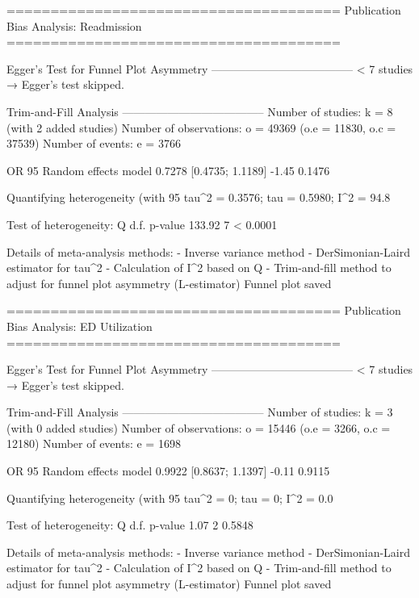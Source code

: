 ======================================
Publication Bias Analysis: Readmission 
======================================
                                                                                                                                                        
Egger's Test for Funnel Plot Asymmetry
--------------------------------------
  < 7 studies → Egger’s test skipped.

Trim-and-Fill Analysis
--------------------------------------
Number of studies: k = 8 (with 2 added studies)
Number of observations: o = 49369 (o.e = 11830, o.c = 37539)
Number of events: e = 3766

                         OR           95%
Random effects model 0.7278 [0.4735; 1.1189] -1.45  0.1476

Quantifying heterogeneity (with 95%
 tau^2 = 0.3576; tau = 0.5980; I^2 = 94.8%

Test of heterogeneity:
      Q d.f.  p-value
 133.92    7 < 0.0001

Details of meta-analysis methods:
- Inverse variance method
- DerSimonian-Laird estimator for tau^2
- Calculation of I^2 based on Q
- Trim-and-fill method to adjust for funnel plot asymmetry (L-estimator)
  Funnel plot saved

======================================
Publication Bias Analysis: ED Utilization 
======================================
                                                                                                                                                        
Egger's Test for Funnel Plot Asymmetry
--------------------------------------
  < 7 studies → Egger’s test skipped.

Trim-and-Fill Analysis
--------------------------------------
Number of studies: k = 3 (with 0 added studies)
Number of observations: o = 15446 (o.e = 3266, o.c = 12180)
Number of events: e = 1698

                         OR           95%
Random effects model 0.9922 [0.8637; 1.1397] -0.11  0.9115

Quantifying heterogeneity (with 95%
 tau^2 = 0; tau = 0; I^2 = 0.0%

Test of heterogeneity:
    Q d.f. p-value
 1.07    2  0.5848

Details of meta-analysis methods:
- Inverse variance method
- DerSimonian-Laird estimator for tau^2
- Calculation of I^2 based on Q
- Trim-and-fill method to adjust for funnel plot asymmetry (L-estimator)
  Funnel plot saved

